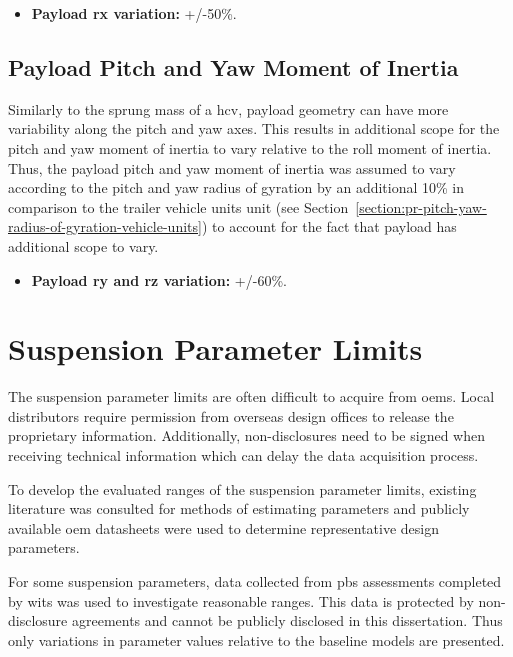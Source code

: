 \begin{itemize}
\item \textbf{Payload \gls{rx} variation:} +/-50\%.
\end{itemize}

\subsection{Payload Pitch and Yaw Moment of Inertia}\label{section:pr-pitch-yaw-radius-of-gyration-payload}

Similarly to the sprung mass of a \gls{hcv}, payload geometry can have more variability along the pitch and yaw axes. This results in additional scope for the pitch and yaw moment of inertia to vary relative to the roll moment of inertia. Thus, the payload pitch and yaw moment of inertia was assumed to vary according to the pitch and yaw radius of gyration by an additional 10\% in comparison to the trailer vehicle units unit (see Section~\ref{section:pr-pitch-yaw-radius-of-gyration-vehicle-units}) to account for the fact that payload has additional scope to vary.

\begin{itemize}
\item \textbf{Payload \gls{ry} and \gls{rz} variation:} +/-60\%.
\end{itemize}

\section{Suspension Parameter Limits}\label{section:pr-suspension-parameter-limits}

The suspension parameter limits are often difficult to acquire from \glspl{oem}. Local distributors require permission from overseas design offices to release the proprietary information. Additionally, non-disclosures need to be signed when receiving technical information which can delay the data acquisition process.

To develop the evaluated ranges of the suspension parameter limits, existing literature was consulted for methods of estimating parameters and publicly available \gls{oem} datasheets were used to determine representative design parameters.

For some suspension parameters, data collected from \gls{pbs} assessments completed by \gls{wits} was used to investigate reasonable ranges. This data is protected by non-disclosure agreements and cannot be publicly disclosed in this dissertation. Thus only variations in parameter values relative to the baseline models are presented.

